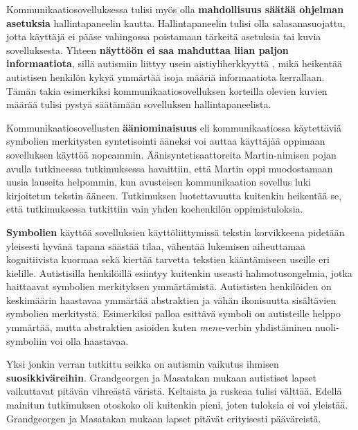 \documentclass[utf8]{gradu3}
\begin{document}
\label{AAC-settings}
Kommunikaatiosovelluksessa tulisi myös olla \textbf{mahdollisuus säätää ohjelman asetuksia} hallintapaneelin kautta. Hallintapaneelin tulisi olla salasanasuojattu, jotta käyttäjä ei pääse vahingossa poistamaan tärkeitä asetuksia tai kuvia sovelluksesta. Yhteen \textbf{näyttöön ei saa mahduttaa liian paljon informaatiota}, sillä autismiin liittyy usein aistiyliherkkyyttä \parencite[]{autism-sensory}, mikä heikentää autistisen henkilön kykyä ymmärtää isoja määriä informaatiota kerrallaan. Tämän takia esimerkiksi kommunikaatiosovelluksen korteilla olevien kuvien määrää tulisi pystyä säätämään sovelluksen hallintapaneelista. \label{AAC-cardsize}

\label{AAC-soundsynth}
Kommunikaatiosovellusten \textbf{ääniominaisuus} eli kommunikaatiossa käytettäviä symbolien merkitysten syntetisointi ääneksi voi auttaa käyttäjää oppimaan sovelluksen käyttöä nopeammin. Äänisyntetisaattoreita Martin-nimisen pojan avulla tutkineessa tutkimuksessa \parencite[]{voca-efficacy} havaittiin, että Martin oppi muodostamaan uusia lauseita helpommin, kun avusteisen kommunikaation sovellus luki kirjoitetun tekstin ääneen. Tutkimuksen luotettavuutta kuitenkin heikentää se, että tutkimuksessa tutkittiin vain yhden koehenkilön oppimistuloksia.

\label{symbol-libraries}
\textbf{Symbolien} käyttöä sovelluksien käyttöliittymissä tekstin korvikkeena pidetään yleisesti hyvänä tapana säästää tilaa, vähentää lukemisen aiheuttamaa kognitiivista kuormaa sekä kiertää tarvetta tekstien kääntämiseen useille eri kielille. Autistisilla henkilöillä esiintyy kuitenkin useasti hahmotusongelmia, jotka haittaavat symbolien merkityksen ymmärtämistä. Autististen henkilöiden on keskimäärin haastavaa ymmärtää abstraktien ja vähän ikonisuutta sisältävien symbolien merkitystä. \label{AAC-abstract-symbols} Esimerkiksi palloa esittävä symboli on autisteille helppo ymmärtää, mutta abstraktien asioiden kuten \textit{mene}-verbin yhdistäminen nuoli-symboliin voi olla haastavaa. \parencite[]{symbol-acquisition-autism}

\label{AAC-colors}
Yksi jonkin verran tutkittu seikka on autismin vaikutus ihmisen \textbf{suosikkiväreihin}. Grandgeorgen ja Masatakan \parencite[]{color-preference-autism} mukaan autistiset lapset vaikuttavat pitävän vihreästä väristä. Keltaista ja ruskeaa tulisi välttää. Edellä mainitun tutkimuksen otoskoko oli kuitenkin pieni, joten tuloksia ei voi yleistää. Grandgeorgen ja Masatakan mukaan lapset pitävät erityisesti pääväreistä.
\end{document}

